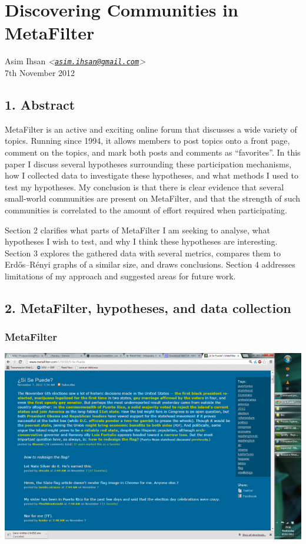 \usepackage{fullpage}

\section{Discovering Communities in MetaFilter}

Asim Ihsan
\emph{\textless{}\href{mailto:asim.ihsan@gmail.com}{\texttt{asim.ihsan@gmail.com}}\textgreater{}}\\7th
November 2012

\subsection{1. Abstract}

MetaFilter is an active and exciting online forum that discusses a wide
variety of topics. Running since 1994, it allows members to post topics
onto a front page, comment on the topics, and mark both posts and
comments as ``favorites''. In this paper I discuss several hypotheses
surrounding these participation mechanisms, how I collected data to
investigate these hypotheses, and what methods I used to test my
hypotheses. My conclusion is that there is clear evidence that several
small-world communities are present on MetaFilter, and that the strength
of such communities is correlated to the amount of effort required when
participating.

Section 2 clarifies what parts of MetaFilter I am seeking to analyse,
what hypotheses I wish to test, and why I think these hypotheses are
interesting. Section 3 explores the gathered data with several metrics,
compares them to Erdős--Rényi graphs of a similar size, and draws
conclusions. Section 4 addresses limitations of my approach and
suggested areas for future work.

\subsection{2. MetaFilter, hypotheses, and data collection}

\subsubsection{MetaFilter}

\includegraphics{01_metafilter_screenshot.png}~

